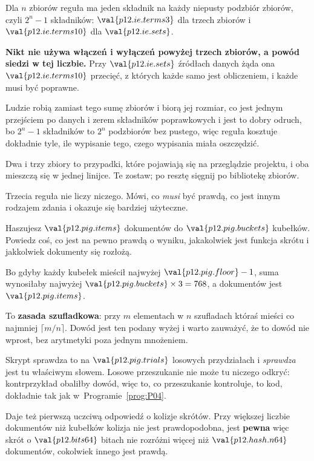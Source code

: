\begin{fr}
Dla $n$ zbiorów reguła ma jeden składnik na każdy niepusty podzbiór zbiorów,
czyli $2^{n} - 1$ składników: $\val{p12.ie.terms3}$ dla trzech zbiorów i
$\val{p12.ie.terms10}$ dla $\val{p12.ie.sets}$.

\begin{trapbox}
\textbf{Nikt nie używa włączeń i wyłączeń powyżej trzech zbiorów, a powód
siedzi w tej liczbie.} Przy $\val{p12.ie.sets}$ źródłach danych żąda ona
$\val{p12.ie.terms10}$ przecięć, z których każde samo jest obliczeniem, i
każde musi być poprawne.

Ludzie robią zamiast tego sumę zbiorów i biorą jej rozmiar, co jest jednym
przejściem po danych i zerem składników poprawkowych \dash{} i jest to dobry
odruch, bo $2^{n}-1$ składników to $2^{n}$ podzbiorów bez pustego, więc reguła
kosztuje dokładnie tyle, ile wypisanie tego, czego wypisania miała oszczędzić.

Dwa i trzy zbiory to przypadki, które pojawiają się na przeglądzie projektu, i
oba mieszczą się w jednej linijce. Te zostaw; po resztę sięgnij po bibliotekę
zbiorów.
\end{trapbox}
\end{fr}

\begin{fr}
Trzecia reguła nie liczy niczego. Mówi, co \emph{musi} być prawdą, co jest
innym rodzajem zdania i okazuje się bardziej użyteczne.

Haszujesz $\val{p12.pig.items}$ dokumentów do $\val{p12.pig.buckets}$
kubełków. Powiedz coś, co jest na pewno prawdą o wyniku, jakakolwiek jest
funkcja skrótu i jakkolwiek dokumenty się rozłożą.
\dotline
\nextframe
\end{fr}

\begin{fr}
Bo gdyby każdy kubełek mieścił najwyżej $\val{p12.pig.floor} - 1$, suma
wynosiłaby najwyżej $\val{p12.pig.buckets} \times 3 = 768$, a dokumentów jest
$\val{p12.pig.items}$.

To \textbf{zasada szufladkowa}: przy $m$ elementach w $n$ szufladach któraś
mieści co najmniej $\lceil m/n \rceil$. Dowód jest ten podany wyżej i warto
zauważyć, że to dowód nie wprost, bez arytmetyki poza jednym mnożeniem.

\begin{note}
Skrypt sprawdza to na $\val{p12.pig.trials}$ losowych przydziałach i
\emph{sprawdza} jest tu właściwym słowem. Losowe przeszukanie nie może tu
niczego odkryć: kontrprzykład obaliłby dowód, więc to, co przeszukanie
kontroluje, to kod, dokładnie tak jak w~Programie~\ref{prog:P04}.
\end{note}

Daje też pierwszą uczciwą odpowiedź o kolizje skrótów. Przy większej liczbie
dokumentów niż kubełków kolizja nie jest prawdopodobna, jest
\textbf{pewna} \dash{} więc skrót o $\val{p12.bits64}$ bitach nie rozróżni
więcej niż $\val{p12.hash.n64}$ dokumentów, cokolwiek innego jest prawdą.
\end{fr}

